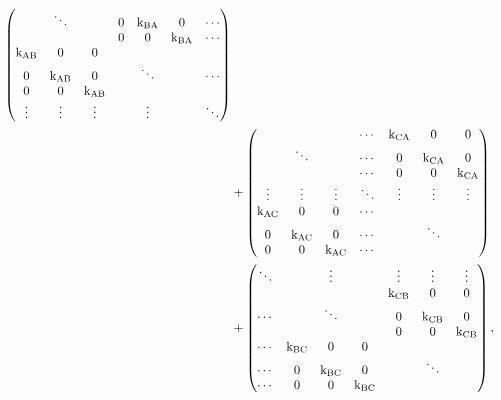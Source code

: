 \begin{align}
\begin{pmatrix}
                   & \ddots  &         & 0       & \textrm{k}_{\textrm{BA}}    & 0       & \cdots \\
                   &         &         & 0       & 0       & \textrm{k}_{\textrm{BA}}    & \cdots \\
           \textrm{k}_{\textrm{AB}}    & 0       & 0       &         &         &         & \\
           0       & \textrm{k}_{\textrm{AB}}    & 0       &         & \ddots  &         & \cdots\\
           0       & 0       & \textrm{k}_{\textrm{AB}}    &         &         &         & \\
           \vdots  & \vdots  & \vdots  &         & \vdots  &         & \ddots \\
         \end{pmatrix} \nonumber \\
      &+ \begin{pmatrix}
                   &         &         & \cdots  & \textrm{k}_{\textrm{CA}}    & 0       & 0 \\
                   & \ddots  &         & \cdots  & 0       & \textrm{k}_{\textrm{CA}}    & 0 \\
                   &         &         & \cdots  & 0       & 0       & \textrm{k}_{\textrm{CA}} \\
           \vdots  & \vdots  & \vdots  & \ddots  & \vdots  & \vdots  & \vdots \\
           \textrm{k}_{\textrm{AC}}    & 0       & 0       & \cdots  &         &         & \\
           0       & \textrm{k}_{\textrm{AC}}    & 0       & \cdots  &         & \ddots  &  \\       
           0       & 0       & \textrm{k}_{\textrm{AC}}    & \cdots  &         &         & \\
         \end{pmatrix} \nonumber \\
      &+ \begin{pmatrix}
           \ddots  &         & \vdots  &         & \vdots  & \vdots  & \vdots \\
                   &         &         &         & \textrm{k}_{\textrm{CB}}    & 0       & 0 \\
           \cdots  &         & \ddots  &         & 0       & \textrm{k}_{\textrm{CB}}    & 0 \\
                   &         &         &         & 0       & 0       & \textrm{k}_{\textrm{CB}} \\
           \cdots  & \textrm{k}_{\textrm{BC}}    & 0       & 0       &         &         &  \\
           \cdots  & 0       & \textrm{k}_{\textrm{BC}}    & 0       &         & \ddots  &  \\
           \cdots  & 0       & 0       & \textrm{k}_{\textrm{BC}}    &         &         &  \\
         \end{pmatrix},
\end{align}

